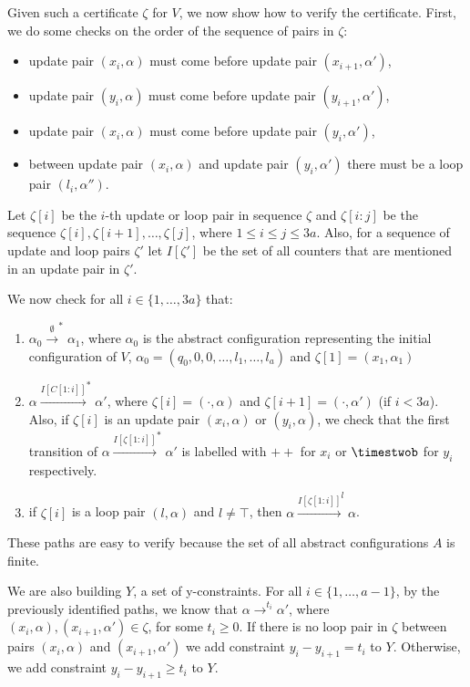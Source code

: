 Given such a certificate $\zeta$ for $V$, we now show how to verify the certificate. 
First, we do some checks on the order of the sequence of pairs in $\zeta$:
\begin{itemize}
    \item update pair $(x_i,\alpha)$ must come before update pair $(x_{i+1},\alpha')$,
    \item update pair $(y_i,\alpha)$ must come before update pair $(y_{i+1},\alpha')$,
    \item update pair $(x_i,\alpha)$ must come before update pair $(y_i,\alpha')$,
    \item between update pair $(x_i,\alpha)$ and update pair $(y_i,\alpha')$ there must be a loop pair $(l_i,\alpha'')$.
\end{itemize}

Let $\zeta[i]$ be the $i$-th update or loop pair in sequence $\zeta$ and $\zeta[i{:}j]$ be the sequence $\zeta[i],\zeta[i+1],\dots,\zeta[j]$, where $1\leq i\leq j\leq 3a$. Also, for a sequence of update and loop pairs $\zeta'$ let $I[\zeta']$ be the set of all counters that are mentioned in an update pair in $\zeta'$. 

We now check for all $i \in\{1,\dots,3a\}$ that:

\begin{enumerate}
    \item \label{check1} $\alpha_0\xrightarrow{\emptyset}^*\alpha_1$, where $\alpha_0$ is the abstract configuration representing the initial configuration of $V$, $\alpha_0=(q_0,0,0,\dots,l_1,\dots,l_a)$ and $\zeta[1]=(x_1,\alpha_1)$
    \item \label{check2} $\alpha\xrightarrow{I[C[1{:}i]]}^* \alpha'$, where $\zeta[i] = (\cdot, \alpha)$ and $\zeta[i+1] = (\cdot,\alpha')$ (if $i<3a$). Also, if $\zeta[i]$ is an update pair $(x_i,\alpha)$ or $(y_i,\alpha)$, we check that the first transition of $\alpha\xrightarrow{I[\zeta[1{:}i]]}^* \alpha'$ is labelled with $++$ for $x_i$ or $\timestwob$ for $y_i$ respectively. 
    \item \label{check3} if $\zeta[i]$ is a loop pair $(l,\alpha)$ and $l\neq\top$, then $\alpha\xrightarrow{I[\zeta[1{:}i]]}^{l} \alpha$.
\end{enumerate}

These paths are easy to verify because the set of all abstract configurations $A$ is finite. 


We are also building $Y$, a set of y-constraints. For all $i\in\{1,\dots,a-1\}$, by the previously identified paths, we know that $\alpha\xrightarrow{}^{t_i} \alpha'$, where $(x_i,\alpha),(x_{i+1},\alpha')\in \zeta$, for some $t_i\geq 0$. If there is no loop pair in $\zeta$ between pairs $(x_i,\alpha)$ and $(x_{i+1},\alpha')$ we add constraint $y_{i}-y_{i+1} = t_i$ to $Y$. Otherwise, we add constraint $y_{i}-y_{i+1}\geq t_i$ to $Y$.  

